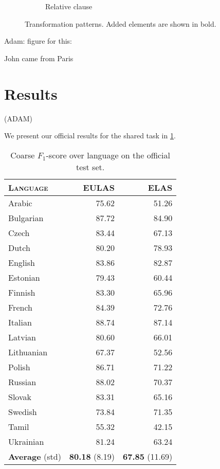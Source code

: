 \documentclass[11pt,a4paper]{article}
\begin{document}
\begin{figure}
\begin{subfigure}{\columnwidth}
  \centering
  \caption{Relative clause}
  \label{fig:pat-rel}
\end{subfigure}

\caption{Transformation patterns. Added elements are shown in bold.}
  \label{fig:patterns}
\end{figure}


Adam: figure for this:

John came from Paris


\section{Results}
(ADAM)

We present our official results for the shared task in \cref{tab:test}. 

\begin{table}[h]
	\centering
	\begin{tabular}{l|rr}
		\textsc{Language} & \textsc{EULAS} & \textsc{ELAS} \\
		\hline
		Arabic & 75.62 & 51.26 \\
		Bulgarian & 87.72 & 84.90 \\
		Czech & 83.44 & 67.13 \\
		Dutch & 80.20 & 78.93 \\
		English & 83.86 & 82.87 \\
		Estonian & 79.43 & 60.44 \\
		Finnish & 83.30 & 65.96 \\
		French & 84.39 & 72.76 \\
		Italian & 88.74 & 87.14 \\
		Latvian & 80.60 & 66.01 \\
		Lithuanian & 67.37 & 52.56 \\
		Polish & 86.71 & 71.22 \\
		Russian & 88.02 & 70.37 \\
		Slovak & 83.31 & 65.16 \\
		Swedish & 73.84 & 71.35 \\
		Tamil & 55.32 & 42.15 \\
		Ukrainian & 81.24 & 63.24 \\
		\textbf{Average} (std) & \textbf{80.18} (8.19) & \textbf{67.85} (11.69) \\
	\end{tabular}
\caption{\label{tab:test} Coarse $F_1$-score over language on the official test set.}
\end{table}
\end{document}
